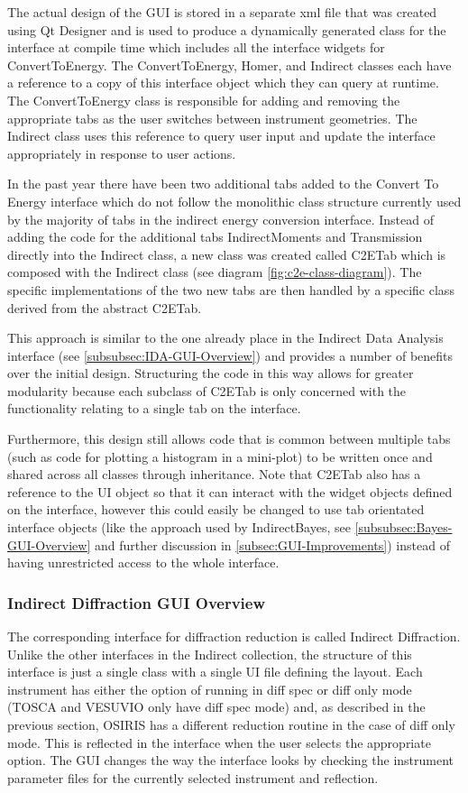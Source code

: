 \documentclass[paper=a4, fontsize=11pt]{scrartcl}	%
\numberwithin{equation}{section}															%
\numberwithin{figure}{section}																%
\numberwithin{table}{section}																%
\begin{document}
The actual design of the GUI is stored in a separate xml file that was created using Qt Designer and is used to produce a dynamically generated class for the interface at compile time which includes all the interface widgets for ConvertToEnergy. The ConvertToEnergy, Homer, and Indirect classes each have a reference to a copy of this interface object which they can query at runtime. The ConvertToEnergy class is responsible for adding and removing the appropriate tabs as the user switches between instrument geometries. The Indirect class uses this reference to query user input and update the interface appropriately in response to user actions.

In the past year there have been two additional tabs added to the Convert To Energy interface which do not follow the monolithic class structure currently used by the majority of tabs in the indirect energy conversion interface. Instead of adding the code for the additional tabs IndirectMoments and Transmission directly into the Indirect class, a new class was created called C2ETab which is composed with the Indirect class (see diagram \ref{fig:c2e-class-diagram}). The specific implementations of the two new tabs are then handled by a specific class derived from the abstract C2ETab.

This approach is similar to the one already place in the Indirect Data Analysis interface (see \ref{subsubsec:IDA-GUI-Overview}) and provides a number of benefits over the initial design. Structuring the code in this way allows for greater modularity because each subclass of C2ETab is only concerned with the functionality relating to a single tab on the interface.

Furthermore, this design still allows code that is common between multiple tabs (such as code for plotting a histogram in a mini-plot) to be written once and shared across all classes through inheritance. Note that C2ETab also has a reference to the UI object so that it can interact with the widget objects defined on the interface, however this could easily be changed to use tab orientated interface objects (like the approach used by IndirectBayes, see \ref{subsubsec:Bayes-GUI-Overview} and further discussion in \ref{subsec:GUI-Improvements}) instead of having unrestricted access to the whole interface.

\subsubsection{Indirect Diffraction GUI Overview}
The corresponding interface for diffraction reduction is called Indirect Diffraction. Unlike the other interfaces in the Indirect collection, the structure of this interface is just a single class with a single UI file defining the layout. Each instrument has either the option of running in diff spec or diff only mode (TOSCA and VESUVIO only have diff spec mode) and, as described in the previous section, OSIRIS has a different reduction routine in the case of diff only mode. This is reflected in the interface when the user selects the appropriate option. The GUI changes the way the interface looks by checking the instrument parameter files for the currently selected instrument and reflection.
\end{document}
